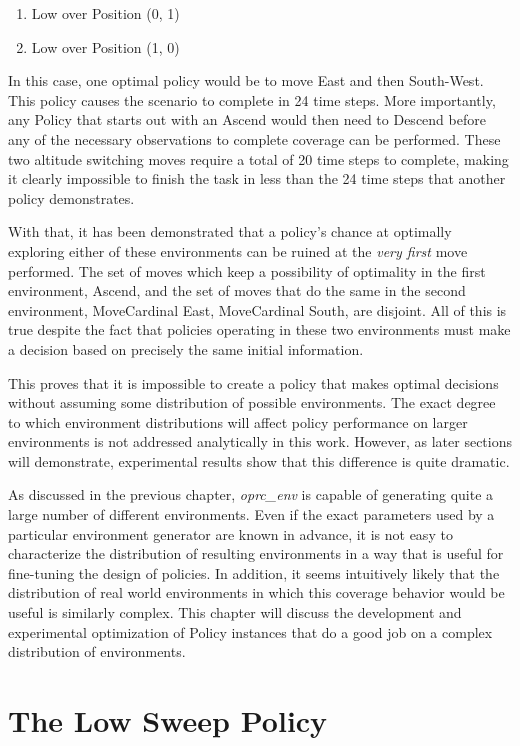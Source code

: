 \begin{enumerate}
	\item Low over Position (0, 1)
	\item Low over Position (1, 0)
\end{enumerate}

In this case, one optimal policy would be to move East and then South-West. This policy causes the scenario to complete in 24 time steps. More importantly, any Policy that starts out with an Ascend would then need to Descend before any of the necessary observations to complete coverage can be performed. These two altitude switching moves require a total of 20 time steps to complete, making it clearly impossible to finish the task in less than the 24 time steps that another policy demonstrates. 

With that, it has been demonstrated that a policy's chance at optimally exploring either of these environments can be ruined at the \textit{very first} move performed. The set of moves which keep a possibility of optimality in the first environment, {Ascend}, and the set of moves that do the same in the second environment, {MoveCardinal East, MoveCardinal South}, are disjoint. All of this is true despite the fact that policies operating in these two environments must make a decision based on precisely the same initial information.

This proves that it is impossible to create a policy that makes optimal decisions without assuming some distribution of possible environments. The exact degree to which environment distributions will affect policy performance on larger environments is not addressed analytically in this work. However, as later sections will demonstrate, experimental results show that this difference is quite dramatic.

As discussed in the previous chapter, \textit{oprc\_env} is capable of generating quite a large number of different environments. Even if the exact parameters used by a particular environment generator are known in advance, it is not easy to characterize the distribution of resulting environments in a way that is useful for fine-tuning the design of policies. In addition, it seems intuitively likely that the distribution of real world environments in which this coverage behavior would be useful is similarly complex. This chapter will discuss the development and experimental optimization of Policy instances that do a good job on a complex distribution of environments.

\section{The Low Sweep Policy}

